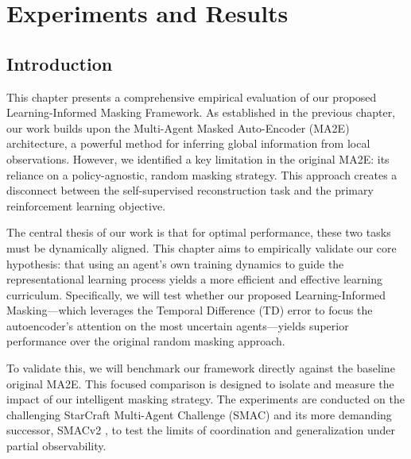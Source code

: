 \chapter{Experiments and Results}



\section*{Introduction}
\label{sec:introduction}

This chapter presents a comprehensive empirical evaluation of our proposed Learning-Informed Masking Framework. As established in the previous chapter, our work builds upon the Multi-Agent Masked Auto-Encoder (MA2E) architecture, a powerful method for inferring global information from local observations. However, we identified a key limitation in the original MA2E: its reliance on a policy-agnostic, random masking strategy. This approach creates a disconnect between the self-supervised reconstruction task and the primary reinforcement learning objective.

The central thesis of our work is that for optimal performance, these two tasks must be dynamically aligned. This chapter aims to empirically validate our core hypothesis: that using an agent's own training dynamics to guide the representational learning process yields a more efficient and effective learning curriculum. Specifically, we will test whether our proposed Learning-Informed Masking—which leverages the Temporal Difference (TD) error to focus the autoencoder's attention on the most uncertain agents—yields superior performance over the original random masking approach.

To validate this, we will benchmark our framework directly against the baseline original MA2E. This focused comparison is designed to isolate and measure the impact of our intelligent masking strategy. The experiments are conducted on the challenging StarCraft Multi-Agent Challenge (SMAC) \parencite{smac} and its more demanding successor, SMACv2 \parencite{smacv2} , to test the limits of coordination and generalization under partial observability.




